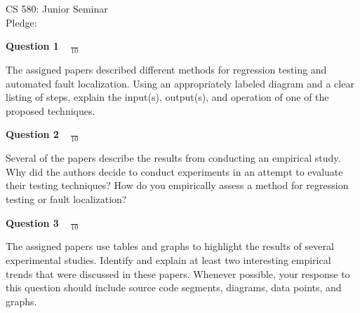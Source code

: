\documentclass[12pt]{article}
\begin{document}
\vspace*{3in}

\begin{center}

CS 580: Junior Seminar \\
Pledge: \\

\end{center}

\newpage
                                   
{\bf Question 1} {\Large $\;\;\;\frac{}{10}$ }

\vspace*{.5in}

The assigned papers described different methods for regression testing
and automated fault localization.  Using an appropriately labeled
diagram and a clear listing of steps, explain the input(s), output(s),
and operation of one of the proposed techniques.

\newpage

{\bf Question 2} {\Large $\;\;\; \frac{}{10}$ }

\vspace*{.5in}

Several of the papers describe the results from conducting an
empirical study.  Why did the authors decide to conduct experiments in
an attempt to evaluate their testing techniques?  How do you
empirically assess a method for regression testing or fault
localization?

\newpage

{\bf Question 3} {\Large $\;\;\; \frac{}{10}$ }

\vspace*{.5in}

The assigned papers use tables and graphs to highlight the results of
several experimental studies.  Identify and explain at least two
interesting empirical trends that were discussed in these papers.
Whenever possible, your response to this question should include
source code segments, diagrams, data points, and graphs.




\end{document}
